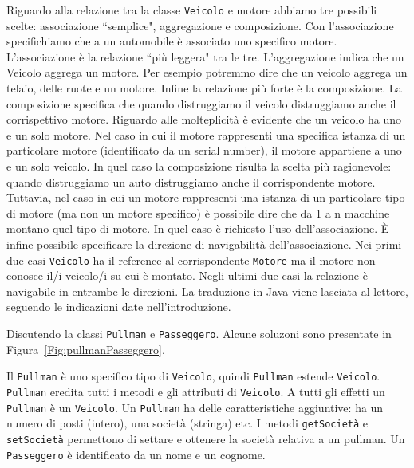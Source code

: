 \documentclass{article}
\begin{document}
Riguardo alla relazione tra la classe \texttt{Veicolo} e motore abbiamo tre possibili scelte: associazione ``semplice", aggregazione e composizione. Con l'associazione specifichiamo che a un automobile \`e associato uno specifico motore. L'associazione \`e la relazione ``pi\`u leggera" tra le tre. L'aggregazione indica che un Veicolo aggrega un motore. Per esempio potremmo dire che un veicolo aggrega un telaio,  delle ruote e un motore. Infine la relazione pi\`u forte \`e la composizione. La composizione specifica che quando distruggiamo il veicolo distruggiamo anche il corrispettivo motore. Riguardo alle molteplicit\`a \`e evidente che un veicolo ha uno e un solo motore. Nel caso in cui il motore rappresenti una specifica istanza di un particolare motore (identificato da un serial number), il motore appartiene a uno e un solo veicolo. In quel caso la composizione risulta la scelta pi\`u ragionevole: quando distruggiamo un auto distruggiamo anche il corrispondente motore. Tuttavia, nel caso in cui un motore rappresenti una istanza di un particolare tipo di motore (ma non un motore specifico) \`e possibile dire che da 1 a n macchine montano quel tipo di motore. In quel caso \`e richiesto l'uso dell'associazione.  \`E infine possibile specificare la direzione di navigabilit\`a dell'associazione. Nei primi due casi \texttt{Veicolo} ha il reference al corrispondente \texttt{Motore} ma il motore non conosce il/i veicolo/i su cui \`e montato. Negli ultimi due casi la relazione \`e navigabile in entrambe le direzioni. La traduzione in Java viene lasciata al lettore, seguendo le indicazioni date nell'introduzione.

Discutendo la classi  \texttt{Pullman} e  \texttt{Passeggero}. Alcune soluzoni sono presentate in Figura~\ref{Fig:pullmanPasseggero}.

Il \texttt{Pullman} \`e uno specifico tipo di \texttt{Veicolo}, quindi \texttt{Pullman} estende  \texttt{Veicolo}. \texttt{Pullman} eredita tutti i metodi e gli attributi di \texttt{Veicolo}. A tutti gli effetti un \texttt{Pullman}  \`e un  \texttt{Veicolo}. Un \texttt{Pullman} ha delle caratteristiche  aggiuntive: ha un numero di posti (intero), una societ\`a (stringa) etc. I metodi \texttt{getSociet\`a} e \texttt{setSociet\`a} permettono di settare e ottenere la societ\`a relativa a un pullman. Un \texttt{Passeggero} \`e identificato da un nome e un cognome. 
\end{document}
